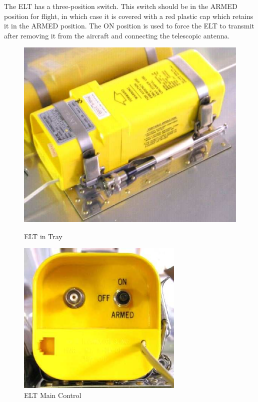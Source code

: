 The ELT has a three-position switch. This switch should be in the ARMED position for flight, in which case it is covered with a red plastic cap which retains it in the ARMED position. The ON position is used to force the ELT to transmit after removing it from the aircraft and connecting the telescopic antenna.
\begin{figure}
[htb]

%
\centering
\begin{minipage}{3in}

%
\centering
\includegraphics[scale=0.8]{../Diagrams/elt2} \caption{ELT in Tray}
\end{minipage}

%
\qquad
\begin{minipage}{3in}

%
\centering
\includegraphics[scale=1]{../Diagrams/elt3} \caption{ELT Main Control}

%
\end{minipage}

%
\end{figure}


